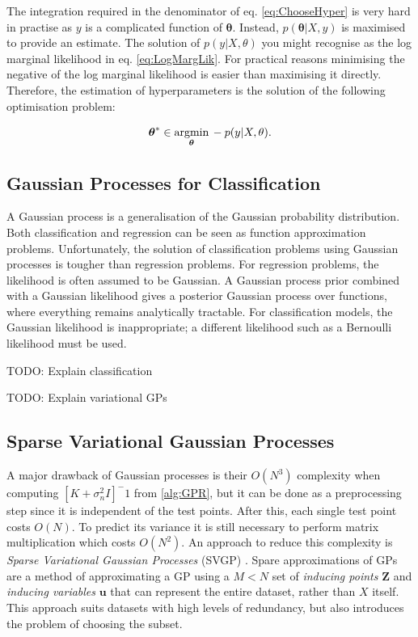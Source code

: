 \documentclass[12pt,a4paper]{report}
\theoremstyle{definition}
\begin{document}
The integration required in the denominator of eq. \ref{eq:ChooseHyper} is very hard in practise as $y$ is a complicated function of $\boldsymbol{\theta}$. 
Instead, $p(\boldsymbol{\theta} | X, y)$ is maximised to provide an estimate.
The solution of $p(y | X, \theta)$ you might recognise as the log marginal likelihood in eq. \ref{eq:LogMargLik}. 
For practical reasons minimising the negative of the log marginal likelihood is easier than maximising it directly.
Therefore, the estimation of hyperparameters is the solution of the following optimisation problem:

\begin{equation}
	\centering
	\boldsymbol{\theta}^* \in \underset{\boldsymbol{\theta}}{\textrm{argmin}} \, -p(y | X, \theta).
\end{equation}

\subsection{Gaussian Processes for Classification}

A Gaussian process is a generalisation of the Gaussian probability distribution. 
Both classification and regression can be seen as function approximation problems. 
Unfortunately, the solution of classification problems using Gaussian processes is tougher than regression problems. 
For regression problems, the likelihood is often assumed to be Gaussian. 
A Gaussian process prior combined with a Gaussian likelihood gives a posterior Gaussian process over functions, where everything remains analytically tractable. 
For classification models, the Gaussian likelihood is inappropriate; a different likelihood such as a Bernoulli likelihood must be used.

TODO: Explain classification

TODO: Explain variational GPs

\subsection{Sparse Variational Gaussian Processes}

A major drawback of Gaussian processes is their $O(N^3)$ complexity when computing $[K + \sigma_{n}^2I]^-1$ from \ref{alg:GPR}, but it can be done as a preprocessing step since it is independent of the test points. 
After this, each single test point costs $O(N)$. 
To predict its variance it is still necessary to perform matrix multiplication which costs $O(N^2)$.
An approach to reduce this complexity is \emph{Sparse Variational Gaussian Processes} (SVGP) \citep{Hensman2014}.
Spare approximations of GPs are a method of approximating a GP using a $M < N$ set of \emph{inducing points} $\textbf{Z}$ and \emph{inducing variables} $\textbf{u}$ that can represent the entire dataset, rather than $X$ itself. 
This approach suits datasets with high levels of redundancy, but also introduces the problem of choosing the subset.
\end{document}

